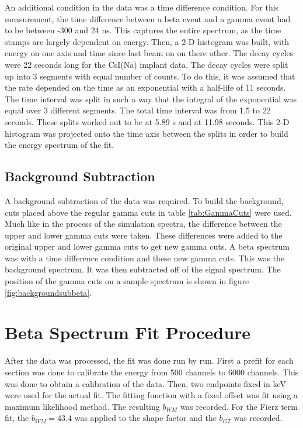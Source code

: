 \documentclass[../MaxHughesThesis.tex]{subfiles}
\begin{document}
An additional condition in the data was a time difference condition.
For this measurement, the time difference between a beta event and a gamma event had to be between -300 and 24 ns.
This captures the entire spectrum, as the time stamps are largely dependent on energy. 
Then, a 2-D histogram was built, with energy on one axis and time since last beam on on there other.
The decay cycles were 22 seconds long for the CsI(Na) implant data. 
The decay cycles were split up into 3 segments with equal number of counts.
To do this, it was assumed that the rate depended on the time as an exponential with a half-life of 11 seconds.
The time interval was split in such a way that the integral of the exponential was equal over 3 different segments.
The total time interval was from 1.5 to 22 seconds.
These splits worked out to be at 5.89 s and at 11.98 seconds. 
This 2-D histogram was projected onto the time axis between the splits in order to build the energy spectrum of the fit. 

\subsection{Background Subtraction}

A background subtraction of the data was required.
To build the background, cuts placed above the regular gamma cuts in table \ref{tab:GammaCuts} were used.
Much like in the process of the simulation spectra, the difference between the upper and lower gamma cuts were taken.
These differences were added to the original upper and lower gamma cuts to get new gamma cuts.
A beta spectrum was with a time difference condition and these new gamma cuts.
This was the background spectrum.
It was then subtracted off of the signal spectrum. 
The position of the gamma cuts on a sample spectrum is shown in figure \ref{fig:backgroundsubbeta}.


\section{Beta Spectrum Fit Procedure}
After the data was processed, the fit was done run by run.
First a prefit for each section was done to calibrate the energy from 500 channels to 6000 channels.
This was done to obtain a calibration of the data.
Then, two endpoints fixed in keV were used for the actual fit.
The fitting function with a fixed offset was fit using a maximum likelihood method.
The resulting $b_{WM}$ was recorded.
For the Fierz term fit, the $b_{WM} = 43.4$ was applied to the shape factor and the $b_{GT}$ was recorded.
\end{document}
